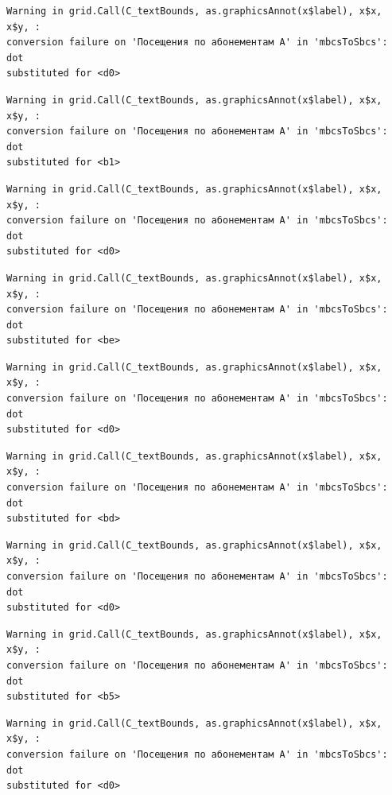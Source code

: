 \documentclass[
  letterpaper,
  DIV=11,
  numbers=noendperiod]{scrartcl}
\begin{document}
\begin{verbatim}
Warning in grid.Call(C_textBounds, as.graphicsAnnot(x$label), x$x, x$y, :
conversion failure on 'Посещения по абонементам А' in 'mbcsToSbcs': dot
substituted for <d0>
\end{verbatim}

\begin{verbatim}
Warning in grid.Call(C_textBounds, as.graphicsAnnot(x$label), x$x, x$y, :
conversion failure on 'Посещения по абонементам А' in 'mbcsToSbcs': dot
substituted for <b1>
\end{verbatim}

\begin{verbatim}
Warning in grid.Call(C_textBounds, as.graphicsAnnot(x$label), x$x, x$y, :
conversion failure on 'Посещения по абонементам А' in 'mbcsToSbcs': dot
substituted for <d0>
\end{verbatim}

\begin{verbatim}
Warning in grid.Call(C_textBounds, as.graphicsAnnot(x$label), x$x, x$y, :
conversion failure on 'Посещения по абонементам А' in 'mbcsToSbcs': dot
substituted for <be>
\end{verbatim}

\begin{verbatim}
Warning in grid.Call(C_textBounds, as.graphicsAnnot(x$label), x$x, x$y, :
conversion failure on 'Посещения по абонементам А' in 'mbcsToSbcs': dot
substituted for <d0>
\end{verbatim}

\begin{verbatim}
Warning in grid.Call(C_textBounds, as.graphicsAnnot(x$label), x$x, x$y, :
conversion failure on 'Посещения по абонементам А' in 'mbcsToSbcs': dot
substituted for <bd>
\end{verbatim}

\begin{verbatim}
Warning in grid.Call(C_textBounds, as.graphicsAnnot(x$label), x$x, x$y, :
conversion failure on 'Посещения по абонементам А' in 'mbcsToSbcs': dot
substituted for <d0>
\end{verbatim}

\begin{verbatim}
Warning in grid.Call(C_textBounds, as.graphicsAnnot(x$label), x$x, x$y, :
conversion failure on 'Посещения по абонементам А' in 'mbcsToSbcs': dot
substituted for <b5>
\end{verbatim}

\begin{verbatim}
Warning in grid.Call(C_textBounds, as.graphicsAnnot(x$label), x$x, x$y, :
conversion failure on 'Посещения по абонементам А' in 'mbcsToSbcs': dot
substituted for <d0>
\end{verbatim}
\end{document}
